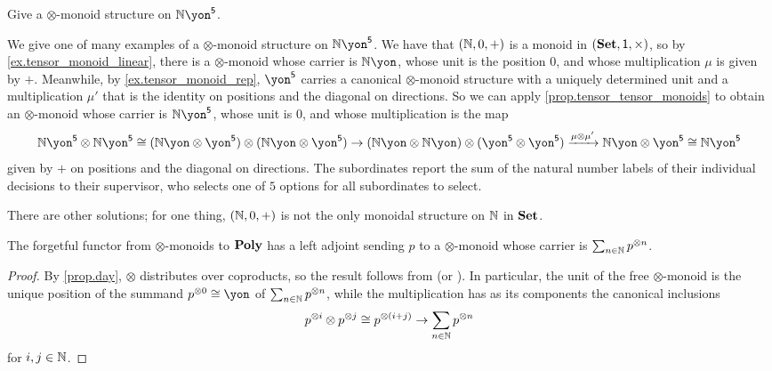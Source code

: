 \documentclass[Book-Poly]{subfiles}
\begin{document}
\begin{exercise}
Give a $\otimes$-monoid structure on $\nn\yon^\5$.
\begin{solution}
We give one of many examples of a $\otimes$-monoid structure on $\nn\yon^\5$.
We have that $(\mathbb{N}, 0, +)$ is a monoid in $(\mathbf{Set}, \textsf{1}, \times)$, so by \cref{ex.tensor_monoid_linear}, there is a $\otimes$-monoid whose carrier is $\nn\yon$, whose unit is the position $0$, and whose multiplication $\mu$ is given by $+$.
Meanwhile, by \cref{ex.tensor_monoid_rep}, $\yon^\5$ carries a canonical $\otimes$-monoid structure with a uniquely determined unit and a multiplication $\mu'$ that is the identity on positions and the diagonal on directions.
So we can apply \cref{prop.tensor_tensor_monoids} to obtain an $\otimes$-monoid whose carrier is $\nn\yon^\5$, whose unit is $0$, and whose multiplication is the map
\[
\nn\yon^\5 \otimes \nn\yon^\5 \iso (\nn\yon \otimes \yon^\5)\otimes(\nn\yon \otimes \yon^\5) \to (\nn\yon \otimes \nn\yon)\otimes(\yon^\5 \otimes \yon^\5) \To{\mu \otimes \mu'} \nn\yon \otimes \yon^\5 \iso \nn\yon^\5
\]
given by $+$ on positions and the diagonal on directions.
The subordinates report the sum of the natural number labels of their individual decisions to their supervisor, who selects one of $5$ options for all subordinates to select.

There are other solutions; for one thing, $(\mathbb{N}, 0, +)$ is not the only monoidal structure on $\mathbb{N}$ in $\mathbf{Set}$.
\end{solution}
\end{exercise}

\begin{proposition} \label{prop.free_parallel_monoid}
The forgetful functor from $\otimes$-monoids to $\mathbf{Poly}$ has a left adjoint sending $p$ to a $\otimes$-monoid whose carrier is $\sum_{n \in \mathbb{N}} p^{\otimes n}$.
\end{proposition}
\begin{proof}
By \cref{prop.day}, $\otimes$ distributes over coproducts, so the result follows from \cite[Chapter~VII, Theorem~2]{MacLane:1998a} (or \cite[Proposition~2.2]{Nlab:category_of_monoids}).
In particular, the unit of the free $\otimes$-monoid is the unique position of the summand $p^{\otimes 0} \iso \yon$ of $\sum_{n \in \mathbb{N}} p^{\otimes n}$, while the multiplication has as its components the canonical inclusions
\[
    p^{\otimes i} \otimes p^{\otimes j} \cong p^{\otimes (i + j)} \to \sum_{n \in \mathbb{N}} p^{\otimes n}
\]
for $i, j \in \mathbb{N}$.
\end{proof}
\end{document}

